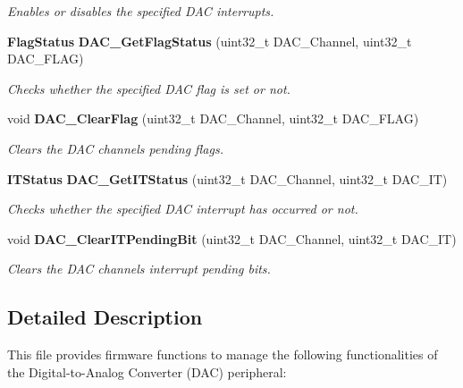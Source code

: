 \begin{DoxyCompactItemize}
\begin{DoxyCompactList}\small\item\em Enables or disables the specified D\+AC interrupts. \end{DoxyCompactList}\item 
\textbf{ Flag\+Status} \textbf{ D\+A\+C\+\_\+\+Get\+Flag\+Status} (uint32\+\_\+t D\+A\+C\+\_\+\+Channel, uint32\+\_\+t D\+A\+C\+\_\+\+F\+L\+AG)
\begin{DoxyCompactList}\small\item\em Checks whether the specified D\+AC flag is set or not. \end{DoxyCompactList}\item 
void \textbf{ D\+A\+C\+\_\+\+Clear\+Flag} (uint32\+\_\+t D\+A\+C\+\_\+\+Channel, uint32\+\_\+t D\+A\+C\+\_\+\+F\+L\+AG)
\begin{DoxyCompactList}\small\item\em Clears the D\+AC channel\textquotesingle{}s pending flags. \end{DoxyCompactList}\item 
\textbf{ I\+T\+Status} \textbf{ D\+A\+C\+\_\+\+Get\+I\+T\+Status} (uint32\+\_\+t D\+A\+C\+\_\+\+Channel, uint32\+\_\+t D\+A\+C\+\_\+\+IT)
\begin{DoxyCompactList}\small\item\em Checks whether the specified D\+AC interrupt has occurred or not. \end{DoxyCompactList}\item 
void \textbf{ D\+A\+C\+\_\+\+Clear\+I\+T\+Pending\+Bit} (uint32\+\_\+t D\+A\+C\+\_\+\+Channel, uint32\+\_\+t D\+A\+C\+\_\+\+IT)
\begin{DoxyCompactList}\small\item\em Clears the D\+AC channel\textquotesingle{}s interrupt pending bits. \end{DoxyCompactList}\end{DoxyCompactItemize}


\subsection{Detailed Description}
This file provides firmware functions to manage the following functionalities of the Digital-\/to-\/\+Analog Converter (D\+AC) peripheral\+: 

